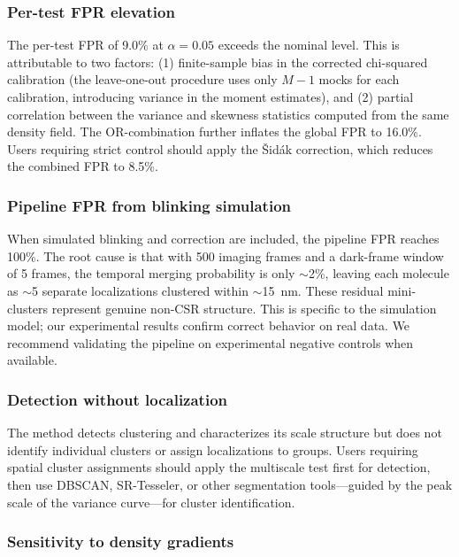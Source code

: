 \documentclass[11pt]{article}
\begin{document}
\subsubsection{Per-test FPR elevation}

The per-test FPR of 9.0\% at $\alpha = 0.05$ exceeds the nominal level.
This is attributable to two factors: (1) finite-sample bias in the
corrected chi-squared calibration (the leave-one-out procedure uses only
$M-1$ mocks for each calibration, introducing variance in the moment
estimates), and (2) partial correlation between the variance and skewness
statistics computed from the same density field. The OR-combination
further inflates the global FPR to 16.0\%. Users requiring strict control
should apply the \v{S}id\'ak correction, which reduces the combined FPR
to 8.5\%.

\subsubsection{Pipeline FPR from blinking simulation}

When simulated blinking and correction are included, the pipeline FPR
reaches 100\%. The root cause is that with 500 imaging frames and a
dark-frame window of 5 frames, the temporal merging probability is only
$\sim$2\%, leaving each molecule as $\sim$5 separate localizations
clustered within $\sim$15~nm. These residual mini-clusters represent
genuine non-CSR structure. This is specific to the simulation model;
our experimental results confirm correct behavior on real data. We
recommend validating the pipeline on experimental negative controls when
available.

\subsubsection{Detection without localization}

The method detects clustering and characterizes its scale structure but
does not identify individual clusters or assign localizations to groups.
Users requiring spatial cluster assignments should apply the multiscale
test first for detection, then use DBSCAN, SR-Tesseler, or other
segmentation tools---guided by the peak scale of the variance curve---for
cluster identification.

\subsubsection{Sensitivity to density gradients}
\end{document}
